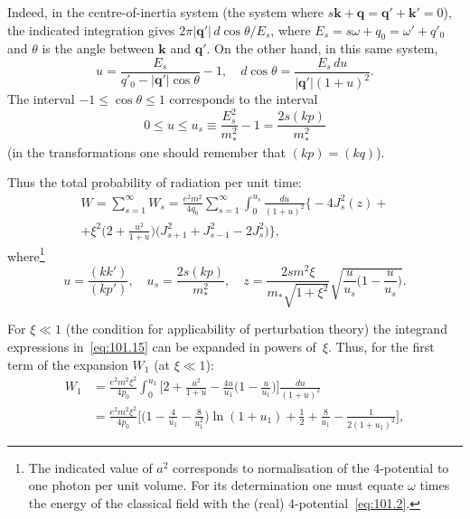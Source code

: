 
Indeed, in the centre-of-inertia system (the system where $s\mathbf{k} + \mathbf{q} = \mathbf{q}' + \mathbf{k}' = 0$), the indicated integration gives $2\pi|\mathbf{q}'|\,d\!\cos\theta/E_s$, where $E_s = s\omega + q_0 = \omega' + q'_0$ and $\theta$ is the angle between $\mathbf{k}$ and $\mathbf{q}'$. On the other hand, in this same system,
\[
u = \frac{E_s}{q'_0 - |\mathbf{q}'|\cos\theta} - 1, \quad d\!\cos\theta = \frac{E_s\,du}{|\mathbf{q}'|(1+u)^2}.
\]
The interval $-1 \leq \cos\theta \leq 1$ corresponds to the interval
\[
0 \leq u \leq u_s \equiv \frac{E_s^2}{m_*^2} - 1 = \frac{2s(kp)}{m_*^2}
\]
(in the transformations one should remember that $(kp) = (kq)$).

Thus the total probability of radiation per unit time:
\begin{equation}
\begin{split}
W = \sum_{s=1}^{\infty} W_s = \frac{e^2 m^2}{4q_0}\sum_{s=1}^{\infty}\int_0^{u_s}\frac{du}{(1+u)^2}\biggl\{-4J_s^2(z) + {} \\
+ \xi^2\biggl(2 + \frac{u^2}{1+u}\biggr)\bigl(J_{s+1}^2 + J_{s-1}^2 - 2J_s^2\bigr)\biggr\},
\end{split}
\label{eq:101.15}
\end{equation}
where\footnote{The indicated value of $a^2$ corresponds to normalisation of the 4-potential to one photon per unit volume. For its determination one must equate $\omega$ times the energy of the classical field with the (real) 4-potential~\eqref{eq:101.2}.}
\begin{equation}
u = \frac{(kk')}{(kp')}, \quad u_s = \frac{2s(kp)}{m_*^2}, \quad z = \frac{2sm^2\xi}{m_*\sqrt{1+\xi^2}}\sqrt{\frac{u}{u_s}\biggl(1 - \frac{u}{u_s}\biggr)}.
\label{eq:101.16}
\end{equation}

For $\xi \ll 1$ (the condition for applicability of perturbation theory) the integrand expressions in~\eqref{eq:101.15} can be expanded in powers of~$\xi$. Thus, for the first term of the expansion $W_1$ (at $\xi \ll 1$):
\begin{equation}
\begin{split}
W_1 &= \frac{e^2 m^2 \xi^2}{4p_0}\int_0^{u_1}\biggl[2 + \frac{u^2}{1+u} - \frac{4u}{u_1}\biggl(1 - \frac{u}{u_1}\biggr)\biggr]\frac{du}{(1+u)^2} \\
&= \frac{e^2 m^2 \xi^2}{4p_0}\biggl[\biggl(1 - \frac{4}{u_1} - \frac{8}{u_1^2}\biggr)\ln(1+u_1) + \frac{1}{2} + \frac{8}{u_1} - \frac{1}{2(1+u_1)^2}\biggr],
\end{split}
\label{eq:101.17}
\end{equation}

